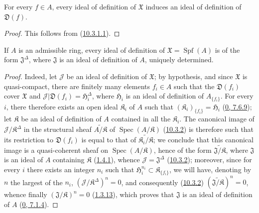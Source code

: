 \begin{proposition}[10.3.4]
\label{I.10.3.4}
For every $f\in A$, every ideal of definition of $\mathfrak{X}$ induces an
ideal of definition of $\mathfrak{D}(f)$.
\end{proposition}

\begin{proof}
This follows from (\hyperref[I.10.3.1.1]{10.3.1.1}).
\end{proof}

\begin{proposition}[10.3.5]
\label{I.10.3.5}
If $A$ is an admissible ring, every ideal of definition of
$\mathfrak{X}=\operatorname{Spf}(A)$ is of the form
$\mathfrak{J}^\Delta$, where $\mathfrak{J}$ is an ideal of definition of
$A$, uniquely determined.
\end{proposition}

\begin{proof}
Indeed, let $\mathscr{J}$ be an ideal of definition of $\mathfrak{X}$;
by hypothesis, and since $\mathfrak{X}$ is quasi-compact, there are finitely
many elements $f_i\in A$ such that the $\mathfrak{D}(f_i)$ cover
$\mathfrak{X}$ and
$\mathscr{J}|\mathfrak{D}(f_i)=\mathfrak{H}_i^\Delta$, where
$\mathfrak{H}_i$ is an ideal of definition of $A_{\{f_i\}}$. For every
$i$, there therefore exists an open ideal $\mathfrak{K}_i$ of $A$ such that
$(\mathfrak{K}_i)_{\{f_i\}}=\mathfrak{H}_i$
(\hyperref[0.7.6.9]{0, 7.6.9}); let $\mathfrak{K}$ be an ideal of
definition of $A$ contained in all the $\mathfrak{K}_i$. The canonical image
of $\mathscr{J}/\mathfrak{K}^\Delta$ in the structural sheaf
$\widetilde{A/\mathfrak{K}}$ of
$\operatorname{Spec}(A/\mathfrak{K})$
(\hyperref[I.10.3.2]{10.3.2}) is therefore such that its restriction to
$\mathfrak{D}(f_i)$ is equal to that of
$\widetilde{\mathfrak{K}_i/\mathfrak{K}}$; we conclude that this canonical
image is a quasi-coherent sheaf on
$\operatorname{Spec}(A/\mathfrak{K})$, hence of the form
$\widetilde{\mathfrak{J}/\mathfrak{K}}$, where $\mathfrak{J}$ is an ideal of
$A$ containing $\mathfrak{K}$ (\hyperref[I.1.4.1]{1.4.1}), whence
$\mathscr{J}=\mathfrak{J}^\Delta$
(\hyperref[I.10.3.2]{10.3.2}); moreover, since for every $i$ there
exists an integer $n_i$ such that
$\mathfrak{H}_i^{n_i}\subset\mathfrak{K}_{\{f_i\}}$, we will have, denoting
by $n$ the largest of the $n_i$,
$(\mathscr{J}/\mathfrak{K}^\Delta)^n=0$, and consequently
(\hyperref[I.10.3.2]{10.3.2})
$(\widetilde{\mathfrak{J}/\mathfrak{K}})^n=0$, whence finally
$(\mathfrak{J}/\mathfrak{K})^n=0$
(\hyperref[I.1.3.13]{1.3.13}), which proves that $\mathfrak{J}$ is an
ideal of definition of $A$ (\hyperref[0.7.1.4]{0, 7.1.4}).
\end{proof}

